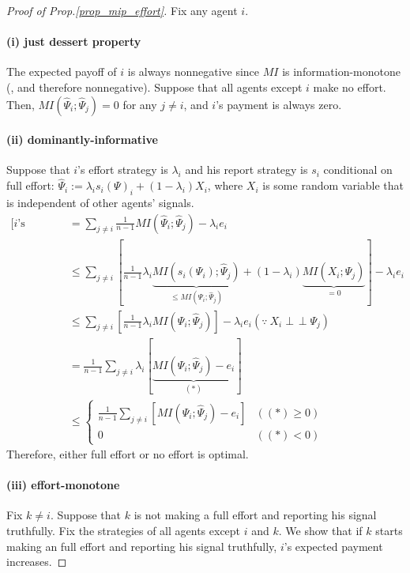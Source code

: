 \documentclass[11pt,a4paper,dvipdfmx]{article}
\theoremstyle{plain}
\renewcommand{\hat}{\widehat}
\newcommand{\1}{\mathbbm{1}}
\newcommand{\indep}{\mathop{\perp\!\!\!\!\perp}}
\begin{document}
\begin{proof}[Proof of Prop.\ref{prop_mip_effort}]
	Fix any agent $i$.
	
	\paragraph{(i) just dessert property}
	The expected payoff of $i$ is always nonnegative since $MI$ is information-monotone (, and therefore nonnegative). Suppose that all agents except $i$ make no effort. Then, $MI(\hat{\Psi}_i; \hat{\Psi}_j) = 0$ for any $j \neq i$, and $i$'s payment is always zero.
	
	\paragraph{(ii) dominantly-informative}
	Suppose that $i$'s effort strategy is $\lambda_i$ and his report strategy is $s_i$ conditional on full effort: $\hat{\Psi}_i := \lambda_i s_i(\Psi)_i + (1 - \lambda_i) X_i$, where $X_i$ is some random variable that is independent of other agents' signals.
	\begin{align*}
		\text{[$i$'s expected payoff]}
		&= \sum_{j \neq i} \frac{1}{n-1} MI(\hat{\Psi}_i; \hat{\Psi}_j) - \lambda_i e_i \\
		&\leq \sum_{j \neq i} \left[
		\frac{1}{n-1} \lambda_i
		\underbrace{MI(s_i(\Psi_i); \hat{\Psi}_j)}_{\leq MI(\Psi_i; \hat{\Psi}_j)}
		+ (1 - \lambda_i)
		\underbrace{MI(X_i; \hat{\Psi}_j)}_{=0}
		\right]
		 - \lambda_i e_i \\
		&\leq \sum_{j \neq i} \left[
		\frac{1}{n-1} \lambda_i MI(\Psi_i; \hat{\Psi}_j)
		\right]
		- \lambda_i e_i (\because \ X_i \indep \Psi_j) \\
		&= \frac{1}{n-1} \sum_{j \neq i} \lambda_i \left[
		\underbrace{
		  MI(\Psi_i; \hat{\Psi}_j) - e_i
		  }_{(*)}
		\right] \\
		&\leq \begin{cases}
			\frac{1}{n-1} \sum_{j \neq i} \left[
		  MI(\Psi_i; \hat{\Psi}_j) - e_i
		\right] & ((*) \geq 0) \\
		0 & ((*) < 0)
		\end{cases}
	\end{align*}
	Therefore, either full effort or no effort is optimal.
	
	\paragraph{(iii) effort-monotone}
	Fix $k \neq i$. Suppose that $k$ is not making a full effort and reporting his signal truthfully. Fix the strategies of all agents except $i$ and $k$. We show that if $k$ starts making an full effort and reporting his signal truthfully, $i$'s expected payment increases.
	

\end{proof}
\end{document}
